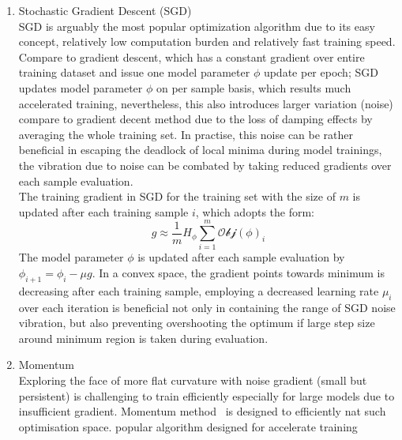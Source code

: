 \begin{enumerate}
    \item Stochastic Gradient Descent (SGD)\\
SGD is arguably the most popular optimization algorithm due to its easy concept, relatively low computation burden and relatively fast training speed. Compare to gradient descent, which has a constant gradient over entire training dataset and issue one  model parameter $\phi$ update per epoch; SGD updates model parameter $\phi$ on per sample basis, which results much accelerated training, nevertheless, this also introduces larger variation (noise) compare to gradient decent method due to the loss of damping effects by averaging the whole training set. In practise, this noise can be rather beneficial in escaping the deadlock of local minima during model trainings, the vibration due to noise can be combated by taking reduced gradients over each sample evaluation. \\
The training gradient in SGD for the training set with the size of $m$ is updated after each training sample $i$, which adopts the form: 
\begin{equation}
    g \approx \frac{1}{m}H_{\phi}\sum_{i=1}^m\mathcal{Obj}(\phi)_i
\end{equation}
The model parameter $\phi$ is updated after each sample evaluation by $\phi_{i+1} = \phi_i - \mu g$. In a convex space, the gradient points towards minimum is decreasing after each training sample, employing a decreased learning rate $\mu_i$ over each iteration is beneficial not only in containing the range of SGD noise vibration, but also preventing overshooting the optimum if large step size around minimum region is taken during evaluation. 
    \item Momentum \\
Exploring the face of more flat curvature with noise gradient (small but persistent) is challenging to train efficiently especially for large models due to insufficient gradient. Momentum method~\cite{POLYAK19641} is designed to efficiently nat such optimisation space.  popular algorithm designed for accelerate training

\end{enumerate}

